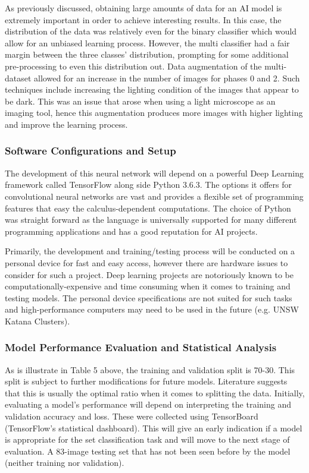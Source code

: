 \documentclass[a4paper]{article}
\begin{document}
            \nopagebreak
            As previously discussed, obtaining large amounts of data for an AI model is extremely important in order to achieve interesting results. In this case, the distribution of the data was relatively even for the binary classifier which would allow for an unbiased learning process. However, the multi classifier had a fair margin between the three classes' distribution, prompting for some additional pre-processing to even this distribution out. Data augmentation of the multi-dataset allowed for an increase in the number of images for phases 0 and 2. Such techniques include increasing the lighting condition of the images that appear to be dark. This was an issue that arose when using a light microscope as an imaging tool, hence this augmentation produces more images with higher lighting and improve the learning process.
            \vspace{3mm}

        \subsubsection{Software Configurations and Setup}
            The development of this neural network will depend on a powerful Deep Learning framework called TensorFlow along side Python 3.6.3. The options it offers for convolutional neural networks are vast and provides a flexible set of programming features that easy the calculus-dependent computations. The choice of Python was straight forward as the language is universally supported for many different programming applications and has a good reputation for AI projects.
            \vspace{3mm}

            Primarily, the development and training/testing process will be conducted on a personal device for fast and easy access, however there are hardware issues to consider for such a project. Deep learning projects are notoriously known to be computationally-expensive and time consuming when it comes to training and testing models. The personal device specifications are not suited for such tasks and high-performance computers may need to be used in the future (e.g. UNSW Katana Clusters).      

        \subsubsection{Model Performance Evaluation and Statistical Analysis}
            As is illustrate in Table 5 above, the training and validation split is 70-30. This split is subject to further modifications for future models. Literature suggests that this is usually the optimal ratio when it comes to splitting the data. Initially, evaluating a model's performance will depend on interpreting the training and validation accuracy and loss. These were collected using TensorBoard (TensorFlow's statistical dashboard). This will give an early indication if a model is appropriate for the set classification task and will move to the next stage of evaluation. A 83-image testing set that has not been seen before by the model (neither training nor validation). 
            \vspace{3mm}
            
\end{document}
